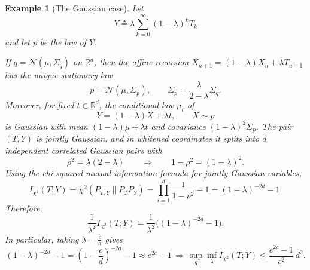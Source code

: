 \documentclass{article}
\theoremstyle{plain}
\theoremstyle{definition}
\theoremstyle{plain}
\newtheorem{exampleinner}[theorem]{Example}
\newenvironment{example}[1][]{%
    \begin{mdframed}[style=examplestyle]%
    \begin{exampleinner}[#1]%
}{%
    \end{exampleinner}%
    \end{mdframed}%
}
\newcommand{\R}{\mathbb R}
\newcommand{\cN}{\mathcal N}
\begin{document}
\begin{example}[The Gaussian case]
    Let
    \[
        Y \triangleq \lambda \sum_{k=0}^\infty (1-\lambda)^k T_k
    \]
    and let $p$ be the law of $Y$.

    If $q=\cN(\mu,\Sigma_q)$ on $\R^d$, then the affine recursion
    $X_{n+1}=(1-\lambda)X_n+\lambda T_{n+1}$ has the unique stationary law
    \[
        p=\cN(\mu,\Sigma_p),
        \qquad
        \Sigma_p=\frac{\lambda}{2-\lambda}\Sigma_q.
    \]
    Moreover, for fixed $t\in\R^d$, the conditional law $\mu_t$ of
    \[
        Y=(1-\lambda)X+\lambda t,\qquad X\sim p
    \]
    is Gaussian with mean $(1-\lambda)\mu+\lambda t$ and covariance $(1-\lambda)^2\Sigma_p$.
    The pair $(T,Y)$ is jointly Gaussian, and in whitened coordinates it splits into $d$
    independent correlated Gaussian pairs with
    \[
        \rho^2=\lambda(2-\lambda)
        \qquad\Longrightarrow\qquad
        1-\rho^2=(1-\lambda)^2.
    \]
    Using the chi-squared mutual information formula for jointly Gaussian variables,
    \[
        I_{\chi^2}(T;Y)=\chi^2(P_{T,Y}\|P_TP_Y)
        = \prod_{i=1}^d\frac{1}{1-\rho^2}-1
        = (1-\lambda)^{-2d}-1.
    \]
    Therefore,
    \[
        \frac{1}{\lambda^2}I_{\chi^2}(T;Y)
        = \frac{1}{\lambda^2}\bigl((1-\lambda)^{-2d}-1\bigr).
    \]
    In particular, taking $\lambda=\frac{c}{d}$ gives
    \[
        (1-\lambda)^{-2d}-1=\left(1-\frac{c}{d}\right)^{-2d}-1 \approx e^{2c}-1
        \,\Rightarrow\,
        \sup_{q} \inf_\lambda I_{\chi^2}(T;Y) \le \frac{e^{2c}-1}{c^2}\,d^2.
    \]
\end{example}


\clearpage


\clearpage
\end{document}
